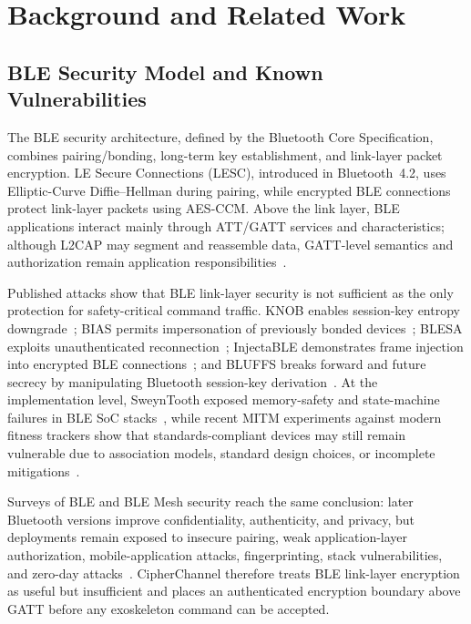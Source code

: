 \documentclass[journal]{IEEEtran}
\begin{document}
\section{Background and Related Work}
\label{sec:background}

\subsection{BLE Security Model and Known Vulnerabilities}

The BLE security architecture, defined by the Bluetooth Core Specification, combines pairing/bonding, long-term key establishment, and link-layer packet encryption.
LE Secure Connections (LESC), introduced in Bluetooth~4.2, uses Elliptic-Curve Diffie--Hellman during pairing, while encrypted BLE connections protect link-layer packets using AES-CCM.
Above the link layer, BLE applications interact mainly through ATT/GATT services and characteristics; although L2CAP may segment and reassemble data, GATT-level semantics and authorization remain application responsibilities~\cite{barua2022survey}.

Published attacks show that BLE link-layer security is not sufficient as the only protection for safety-critical command traffic.
KNOB enables session-key entropy downgrade~\cite{antonioli2020knob}; BIAS permits impersonation of previously bonded devices~\cite{antonioli2020bias}; BLESA exploits unauthenticated reconnection~\cite{wu2020blesa}; InjectaBLE demonstrates frame injection into encrypted BLE connections~\cite{cayre2021injectable}; and BLUFFS breaks forward and future secrecy by manipulating Bluetooth session-key derivation~\cite{antonioli2023bluffs}.
At the implementation level, SweynTooth exposed memory-safety and state-machine failures in BLE SoC stacks~\cite{garbelini2020sweyntooth}, while recent MITM experiments against modern fitness trackers show that standards-compliant devices may still remain vulnerable due to association models, standard design choices, or incomplete mitigations~\cite{gress2025fitness}.

Surveys of BLE and BLE Mesh security reach the same conclusion: later Bluetooth versions improve confidentiality, authenticity, and privacy, but deployments remain exposed to insecure pairing, weak application-layer authorization, mobile-application attacks, fingerprinting, stack vulnerabilities, and zero-day attacks~\cite{barua2022survey,ghori2020blemesh,caesar2022survey}.
CipherChannel therefore treats BLE link-layer encryption as useful but insufficient and places an authenticated encryption boundary above GATT before any exoskeleton command can be accepted.
\end{document}

